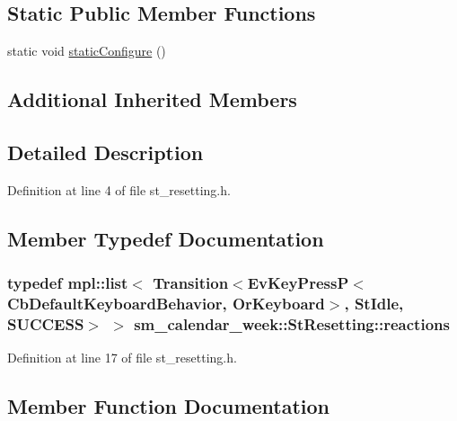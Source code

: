 \subsection*{Static Public Member Functions}
\begin{DoxyCompactItemize}
\item 
static void \hyperlink{structsm__calendar__week_1_1StResetting_a766c7040137e5f2cdc7bbbf58e221caa}{static\+Configure} ()
\end{DoxyCompactItemize}
\subsection*{Additional Inherited Members}


\subsection{Detailed Description}


Definition at line 4 of file st\+\_\+resetting.\+h.



\subsection{Member Typedef Documentation}
\subsubsection[{\texorpdfstring{reactions}{reactions}}]{\setlength{\rightskip}{0pt plus 5cm}typedef mpl\+::list$<$ Transition$<$Ev\+Key\+PressP$<$Cb\+Default\+Keyboard\+Behavior, {\bf Or\+Keyboard}$>$, {\bf St\+Idle}, {\bf S\+U\+C\+C\+E\+SS}$>$ $>$ {\bf sm\+\_\+calendar\+\_\+week\+::\+St\+Resetting\+::reactions}}\hypertarget{structsm__calendar__week_1_1StResetting_a5e82475dad4415094786753e2c71ad67}{}\label{structsm__calendar__week_1_1StResetting_a5e82475dad4415094786753e2c71ad67}


Definition at line 17 of file st\+\_\+resetting.\+h.



\subsection{Member Function Documentation}
